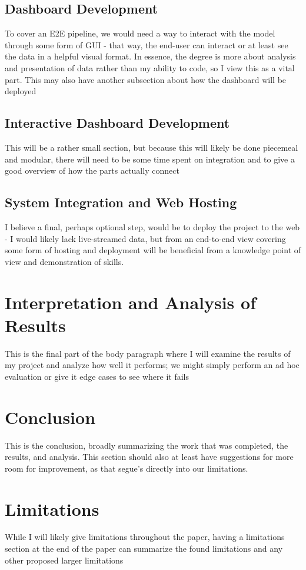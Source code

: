 \documentclass[runningheads]{llncs}
\begin{document}
\subsection{Dashboard Development}
To cover an E2E pipeline, we would need a way to interact with the model through some form of GUI - that way, the end-user can interact or at least see the data in a helpful visual format. In essence, the degree is more about analysis and presentation of data rather than my ability to code, so I view this as a vital part. This may also have another subsection about how the dashboard will be deployed

\subsection{Interactive Dashboard Development}
This will be a rather small section, but because this will likely be done piecemeal and modular, there will need to be some time spent on integration and to give a good overview of how the parts actually connect

\subsection{System Integration and Web Hosting}
I believe a final, perhaps optional step, would be to deploy the project to the web - I would likely lack live-streamed data, but from an end-to-end view covering some form of hosting and deployment will be beneficial from a knowledge point of view and demonstration of skills.

\section{Interpretation and Analysis of Results}
This is the final part of the body paragraph where I will examine the results of my project and analyze how well it performs; we might simply perform an ad hoc evaluation or give it edge cases to see where it fails

\section{Conclusion}
This is the conclusion, broadly summarizing the work that was completed, the results, and analysis. This section should also at least have suggestions for more room for improvement, as that segue's directly into our limitations.

\section{Limitations}
While I will likely give limitations throughout the paper, having a limitations section at the end of the paper can summarize the found limitations and any other proposed larger limitations
\end{document}
